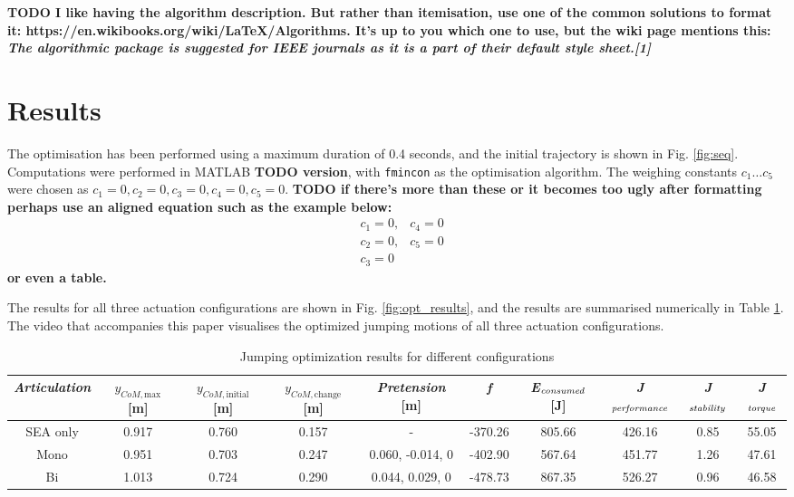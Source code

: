 \documentclass[letterpaper, 10 pt, conference]{ieeeconf}  %
\begin{document}
\textbf{TODO I like having the algorithm description. But rather than itemisation, use one of the common solutions to format it: https://en.wikibooks.org/wiki/LaTeX/Algorithms. It's up to you which one to use, but the wiki page mentions this: \textit{The algorithmic package is suggested for IEEE journals as it is a part of their default style sheet.[1]}}


\section{Results} \label{sec:results}
The optimisation has been performed using a maximum duration of 0.4 seconds, and the initial trajectory is shown in Fig. \ref{fig:seq}. Computations were performed in MATLAB \textbf{TODO version}, with \texttt{fmincon} as the optimisation algorithm. The weighing constants $c_1 \dots c_5$ were chosen as $c_1 = 0, c_2 = 0, c_3 = 0, c_4 = 0, c_5 = 0$. \textbf{TODO if there's more than these or it becomes too ugly after formatting perhaps use an aligned equation such as the example below:}
\begin{equation}
	\begin{aligned}
		&c_1 = 0, & c_4 = 0 \\
		&c_2 = 0, & c_5 = 0 \\
		&c_3 = 0 &
	\end{aligned}
\end{equation}
\textbf{or even a table.}

The results for all three actuation configurations are shown in Fig. \ref{fig:opt_results}, and the results are summarised numerically in Table \ref{table:maxheight}. The video that accompanies this paper visualises the optimized jumping motions of all three actuation configurations.


\begin{table}[ht]
	\caption{Jumping optimization results for different configurations}
	\label{table:maxheight}
	\begin{center}
		\begin{tabular}[t]{c|c|c||c|c|c|c|c|c|c}
			\textit{Articulation} &  $y_{CoM,\text{max}}$ [m] & $y_{CoM,\text{initial}}$ [m]& $y_{CoM,\text{change}}$ [m]& \textit{Pretension} [m] & \textit{f} & \textit{E}$_{\text{\textit{consumed}}}$ [J] & \textit{J}$_{\text{\textit{performance}}}$ & \textit{J}$_{\text{\textit{stability}}}$ & \textit{J}$_{\text{\textit{torque}}}$\\ 
			\hline
			SEA only& 0.917 &0.760  &0.157 &- &-370.26  & 805.66 & 426.16  &0.85  &   55.05\\
			\hline
			Mono &0.951 &0.703 &0.247 &  0.060, -0.014, 0  & -402.90 & 567.64& 451.77 & 1.26 &47.61 \\
			\hline
			Bi &1.013 &0.724 &0.290 &  0.044, 0.029, 0 & -478.73 & 867.35 & 526.27 & 0.96 & 46.58
		\end{tabular}
	\end{center}
\end{table}
\end{document}
